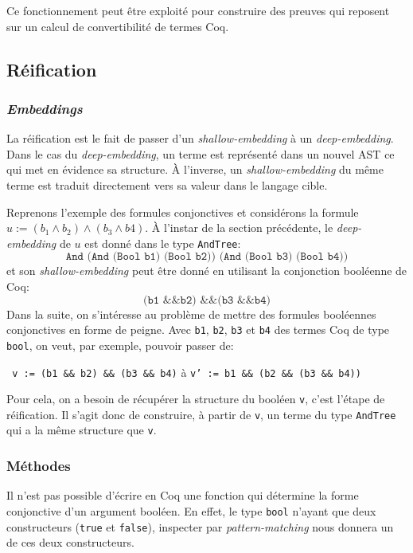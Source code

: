 \documentclass[11pt]{article}
\begin{document}
Ce fonctionnement peut être exploité pour construire des preuves qui reposent sur un calcul de convertibilité de termes Coq.


\subsection{Réification} \label{reification}

\subsubsection{\textit{Embeddings}}

La réification est le fait de passer d'un \textit{shallow-embedding} à un \textit{deep-embedding}. Dans le cas du \textit{deep-embedding}, un terme est représenté dans un nouvel AST ce qui met en évidence sa structure. À l'inverse, un \textit{shallow-embedding} du même terme est traduit directement vers sa valeur dans le langage cible. \medbreak

Reprenons l'exemple des formules conjonctives et considérons la formule $ u := (b_1 \wedge b_2) \wedge (b_3 \wedge b4)$. À l'instar de la section précédente, le \textit{deep-embedding} de $u$ est donné dans le type \texttt{AndTree}:
\[\texttt{And (And (Bool b1) (Bool b2)) (And (Bool b3) (Bool b4))}\] 
et son \textit{shallow-embedding} peut être donné en utilisant la conjonction booléenne de Coq: 
\[\texttt{(b1 \&\& b2) \&\& (b3 \&\& b4)} \]
Dans la suite, on s'intéresse au problème de mettre des formules booléennes conjonctives en forme de peigne. Avec \texttt{b1}, \texttt{b2}, \texttt{b3} et \texttt{b4} des termes Coq de type \texttt{bool}, on veut, par exemple, pouvoir passer de: 
\begin{center}
\texttt{ v := (b1 \&\& b2) \&\& (b3 \&\& b4)}  \hspace{.5cm} à   \hspace{.5cm}  \texttt{v' := b1 \&\& (b2 \&\& (b3 \&\& b4))}
\end{center}
Pour cela, on a besoin de récupérer la structure du booléen \texttt{v}, c'est l'étape de réification. Il s'agit donc de construire, à partir de \texttt{v}, un terme du type \texttt{AndTree} qui a la même structure que \texttt{v}.

\subsubsection{Méthodes}

Il n'est pas possible d'écrire en Coq une fonction qui détermine la forme conjonctive d'un argument booléen. En effet, le type \texttt{bool} n'ayant que deux constructeurs (\texttt{true} et \texttt{false}), inspecter par \textit{pattern-matching} nous donnera un de ces deux constructeurs.\medbreak
\end{document}
